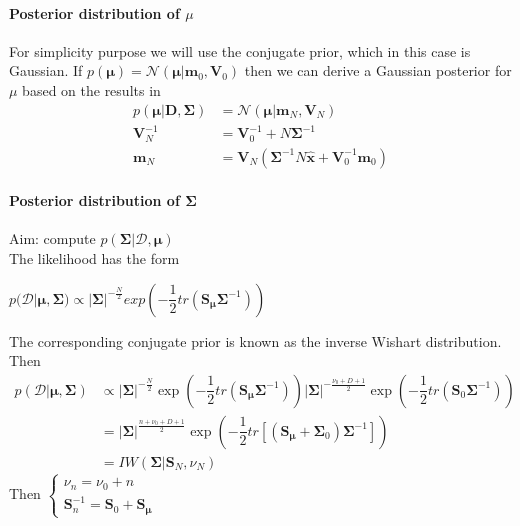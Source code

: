 \paragraph{Posterior distribution of $\mu$}
 For simplicity purpose we will use the conjugate prior, which in this case is Gaussian.
 If $p(\bm{\mu}) = \mathcal{N}(\bm{\mu}|\bm{m}_{0},\bm{V}_{0})$ then we can derive a 
 Gaussian posterior for $\mu$ based on the results in 
 \begin{align*}
     p(\bm{\mu}|\bm{D},\bm{\Sigma}) &= \mathcal{N}(\bm{\mu}|\bm{m}_{N}, \bm{V}_{N})\\
     \bm{V}_{N}^{-1} &= \bm{V}_{0}^{-1} + N\bm{\Sigma}^{-1}\\
     \bm{m}_{N} &= \bm{V}_{N}\left(\bm{\Sigma}^{-1}N\hat{\bm{x}} +
     \bm{V}_{0}^{-1}\bm{m}_{0}\right)
 \end{align*}

 \paragraph{Posterior distribution of $\bm{\Sigma}$}
 Aim: compute $p(\bm{\Sigma}|\mathcal{D},\bm{\mu})$\\
 The likelihood has the form 
 \begin{center}
     $p(\mathcal{D}|\bm{\mu},\bm{\Sigma}) \propto |\bm{\Sigma}|^{-\frac{N}{2}}
     exp\left(-\dfrac{1}{2}tr(\bm{S}_{\bm{\mu}}\bm{\Sigma}^{-1})\right)$
 \end{center}
 The corresponding conjugate prior is known as the inverse Wishart distribution.
 Then 
 \begin{align*}
     p(\mathcal{D}|\bm{\mu},\bm{\Sigma}) 
     &\propto |\bm{\Sigma}|^{-\frac{N}{2}}\exp\left(-\dfrac{1}{2}tr(\bm{S}_{\bm{\mu}}
     \bm{\Sigma}^{-1})\right) 
     |\bm{\Sigma}|^{-\frac{\nu_{0}+D+1}{2}}\exp\left(-\dfrac{1}{2}tr(\bm{S}_{0}
     \bm{\Sigma}^{-1})\right)\\
     &= |\bm{\Sigma}|^{\frac{n+\nu_{0}+D+1}{2}}\exp\left(-\dfrac{1}{2}tr\left[
     (\bm{S}_{\bm{\mu}}+\bm{\Sigma}_{0})\bm{\Sigma}^{-1}\right]\right)\\
     &= IW(\bm{\Sigma}|\bm{S}_{N},\nu_{N})
 \end{align*}
 Then $\begin{cases}
    \nu_{n} = \nu_{0} + n\\
    \bm{S}_{n}^{-1} = \bm{S}_{0} + \bm{S}_{\bm{\mu}}
\end{cases}$
 
